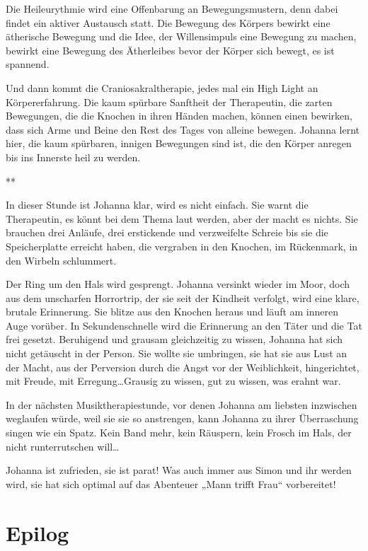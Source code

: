 \documentclass[10pt,titlepage,a5paper]{book}
\newcommand{\sterne}{\par{\centering ***\par}}
\begin{document}
Die Heileurythmie wird eine Offenbarung an Bewegungsmustern, denn dabei findet ein aktiver Austausch statt. Die Bewegung des Körpers bewirkt eine ätherische Bewegung und die Idee, der Willensimpuls eine Bewegung zu machen, bewirkt eine Bewegung des Ätherleibes bevor der Körper sich bewegt, es ist spannend.

Und dann kommt die Craniosakraltherapie, jedes mal ein High Light an Körpererfahrung. Die kaum spürbare Sanftheit der Therapeutin, die zarten Bewegungen, die die Knochen in ihren Händen machen, können einen bewirken, dass sich Arme und Beine den Rest des Tages von alleine bewegen. Johanna lernt hier, die kaum spürbaren, innigen Bewegungen sind ist, die den Körper anregen bis ins Innerste heil zu werden.

\sterne

In dieser Stunde ist Johanna klar, wird  es nicht einfach. Sie warnt die Therapeutin, es könnt bei dem Thema laut werden, aber der macht es nichts. Sie brauchen drei Anläufe, drei erstickende und verzweifelte Schreie bis sie die Speicherplatte erreicht haben, die vergraben in den Knochen, im Rückenmark, in den Wirbeln schlummert.

Der Ring um den Hals wird gesprengt. Johanna versinkt wieder im Moor, doch aus dem unscharfen Horrortrip, der sie seit der Kindheit verfolgt, wird eine klare, brutale Erinnerung. Sie blitze aus den Knochen heraus und läuft am inneren Auge vorüber. In Sekundenschnelle wird die Erinnerung an den Täter und die Tat frei gesetzt. Beruhigend und grausam gleichzeitig zu wissen, Johanna hat sich nicht getäuscht in der Person. Sie wollte sie umbringen, sie hat sie aus Lust an der Macht, aus der Perversion durch die Angst vor der Weiblichkeit, hingerichtet, mit Freude, mit Erregung\dots  Grausig zu wissen, gut zu wissen, was erahnt war.

In der nächsten Musiktherapiestunde, vor denen Johanna am liebsten inzwischen weglaufen würde, weil sie sie so anstrengen, kann Johanna zu ihrer Überraschung singen wie ein Spatz. Kein Band mehr, kein Räuspern, kein Frosch im Hals, der nicht runterrutschen will\dots 

Johanna ist zufrieden, sie ist parat! Was auch immer aus Simon und ihr werden wird, sie hat sich optimal auf das Abenteuer „Mann trifft Frau“ vorbereitet! 


\chapter*{Epilog}
 
\end{document}
